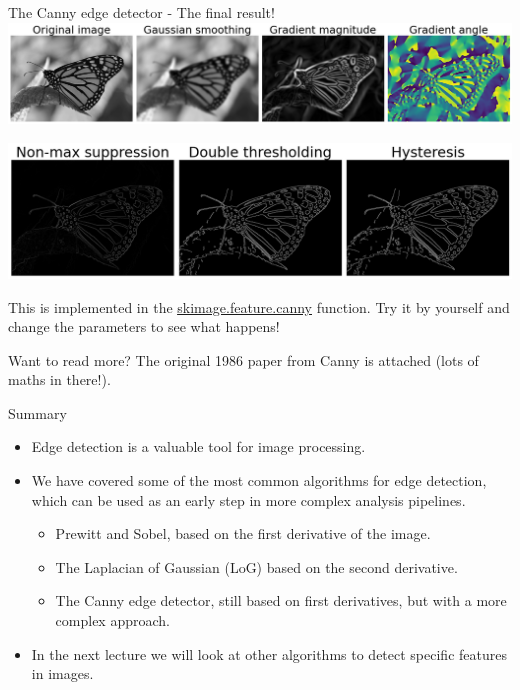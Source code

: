 \documentclass[9pt, aspectratio=169]{beamer}
\begin{document}
\begin{frame}
    {The Canny edge detector - The final result!}
    \centering
    \includegraphics[width=\textwidth]{canny_step1-2.png}

    \includegraphics[width=.75\textwidth]{canny_step3-5.png}

    This is implemented in the \href{https://scikit-image.org/docs/dev/api/skimage.feature.html\#skimage.feature.canny}{\underline{skimage.feature.canny}} function.
    Try it by yourself and change the parameters to see what happens!

    Want to read more? The original 1986 paper from Canny is attached (lots of maths in there!).
\end{frame}

\begin{frame}
    {Summary}
    \begin{itemize}
        \item Edge detection is a valuable tool for image processing.
        \item We have covered some of the most common algorithms for edge detection, which can be used as an early step in more complex analysis pipelines.
              \begin{itemize}
                  \item Prewitt and Sobel, based on the first derivative of the image.
                  \item The Laplacian of Gaussian (LoG) based on the second derivative.
                  \item The Canny edge detector, still based on first derivatives, but with a more complex approach.
              \end{itemize}
        \item In the next lecture we will look at other algorithms to detect specific features in images.
    \end{itemize}



\end{frame}
\end{document}
